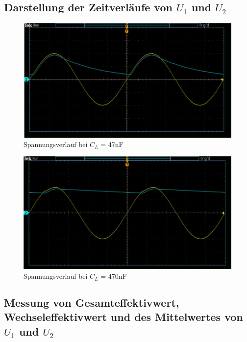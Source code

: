 \documentclass{article}
\begin{document}
\newpage

\subsection{Darstellung der Zeitverläufe von $U_1$ und $U_2$}

\begin{figure}[h]
  \begin{center}
    \includegraphics[scale=0.6]{../assets/images/EL1P2/aufgabe 3 47n.JPG}
    \caption{Spannungsverlauf bei $C_L$ = 47nF}
  \end{center}
\end{figure}

\begin{figure}[h]
  \begin{center}
    \includegraphics[scale=0.6]{../assets/images/EL1P2/aufgabe 3 470n.JPG}
    \caption{Spannungsverlauf bei $C_L$ = 470nF}
  \end{center}
\end{figure}

\newpage

\subsection{Messung von Gesamteffektivwert, Wechseleffektivwert und des Mittelwertes von $U_1$ und $U_2$}
\end{document}
